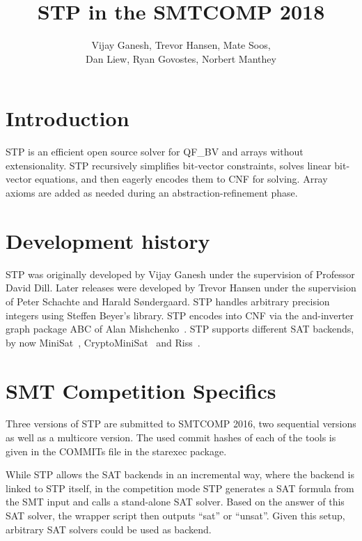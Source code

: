 \documentclass{llncs}
\begin{document}
\title{STP in the SMTCOMP 2018}
\author{Vijay Ganesh, Trevor Hansen, Mate Soos, \\Dan Liew, Ryan Govostes, Norbert Manthey}
\institute{}

\maketitle
\thispagestyle{empty}
\pagestyle{empty}

\section{Introduction}
STP\cite{Vijay:Thesis:2007} is an efficient open source solver for QF\_BV and arrays without extensionality. STP recursively simplifies bit-vector constraints, solves linear bit-vector equations, and then eagerly encodes them to CNF for solving. Array axioms are added as needed during an abstraction-refinement phase.

\section{Development history}
STP was originally developed by Vijay Ganesh under the supervision of Professor David Dill. Later releases were developed by Trevor Hansen under the supervision of Peter Schachte and Harald Søndergaard. STP handles arbitrary precision integers using Steffen Beyer's library. STP encodes into CNF via the and-inverter graph package ABC of Alan Mishchenko~\cite{Brayton:2010:AAI:2144310.2144317}.
STP supports different SAT backends, by now MiniSat~\cite{MiniSat:github}, CryptoMiniSat~\cite{CMS:github} and Riss~\cite{Riss:github}.

\section{SMT Competition Specifics}
Three versions of STP are submitted to SMTCOMP 2016, two sequential versions as well as a multicore version.
The used commit hashes of each of the tools is given in the COMMITs file in the starexec package.

While STP allows the SAT backends in an incremental way, where the backend is linked to STP itself, in the competition mode STP generates a SAT formula from the SMT input and calls a stand-alone SAT solver.
Based on the answer of this SAT solver, the wrapper script then outputs ``sat'' or ``unsat''.
Given this setup, arbitrary SAT solvers could be used as backend.
\end{document}

